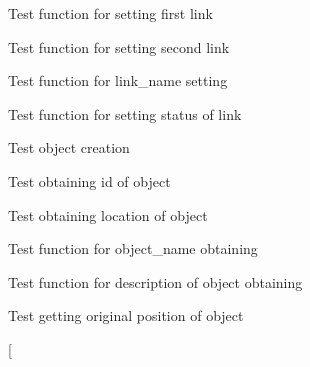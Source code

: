 \begin{DoxyRefList}
\item[\label{test__test000028}%
\hypertarget{test__test000028}{}%
Global \hyperlink{link__test_8c_af0f992e367c55a169d9d3f1f4cf58d37}{test2\+\_\+link\+\_\+set\+\_\+link1} ()]Test function for setting first link  
\item[\label{test__test000030}%
\hypertarget{test__test000030}{}%
Global \hyperlink{link__test_8c_ac4fcf188fc807162c5c279962367faa0}{test2\+\_\+link\+\_\+set\+\_\+link2} ()]Test function for setting second link  
\item[\label{test__test000025}%
\hypertarget{test__test000025}{}%
Global \hyperlink{link__test_8c_aa66c1e991620a5a758ba6e4d6b4a8b73}{test2\+\_\+link\+\_\+set\+\_\+name} ()]Test function for link\+\_\+name setting  
\item[\label{test__test000032}%
\hypertarget{test__test000032}{}%
Global \hyperlink{link__test_8c_a315ea19cd24434d2153b5df9f372a561}{test2\+\_\+link\+\_\+set\+\_\+status} ()]Test function for setting status of link  
\item[\label{test__test000051}%
\hypertarget{test__test000051}{}%
Global \hyperlink{object__test_8c_add54ab5e33a1b0a93e9ddcf73591bd9f}{test2\+\_\+object\+\_\+create} ()]Test object creation  
\item[\label{test__test000053}%
\hypertarget{test__test000053}{}%
Global \hyperlink{object__test_8c_a1ff250f0f43297f57fcce1f3a6ae490b}{test2\+\_\+object\+\_\+get\+\_\+id} ()]Test obtaining id of object  
\item[\label{test__test000055}%
\hypertarget{test__test000055}{}%
Global \hyperlink{object__test_8c_aa8e3d1f2c80097572d9a453737d8cd44}{test2\+\_\+object\+\_\+get\+\_\+location} ()]Test obtaining location of object  
\item[\label{test__test000060}%
\hypertarget{test__test000060}{}%
Global \hyperlink{object__test_8c_abdfafbc7b8588d3dcdb05fd2beb2397e}{test2\+\_\+object\+\_\+get\+\_\+name} ()]Test function for object\+\_\+name obtaining  
\item[\label{test__test000065}%
\hypertarget{test__test000065}{}%
Global \hyperlink{object__test_8c_af05f0ac1f5b56dd4cd7bedf9f5170cda}{test2\+\_\+object\+\_\+get\+\_\+original\+\_\+description} ()]Test function for description of object obtaining  
\item[\label{test__test000095}%
\hypertarget{test__test000095}{}%
Global \hyperlink{object__test_8c_a90212ac853f2702bcf7f83046f493810}{test2\+\_\+object\+\_\+get\+\_\+original\+\_\+position} ()]Test getting original position of object  
\item[\label{test__test000101}%

\end{DoxyRefList}
